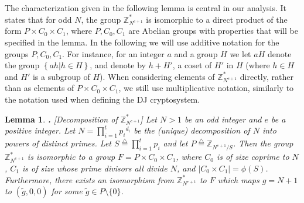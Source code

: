 \documentclass{article}
\def\eqdef{\stackrel {\triangle}{=}}
\newcommand{\order}{{\mathrm{ord}}}
\newcommand{\encdj}{{E}_{N,e}}
\newcommand{\set}[1]{\left\{#1\right\}}
\newcommand{\size}[1]{|#1|}
\newcommand{\condset}[2]{\set{#1|#2}}
\newcommand{\Z}{{\mathbb{Z}}}
\newtheorem{LEMMA}{Lemma}[section]
\newenvironment{lemma}{\begin{LEMMA} \hspace{-.85em} {\bf .} \rm}%
	{\end{LEMMA}}
\newcommand{\U}[1]{\mathbb{Z}_{#1}^*}
\begin{document}
The characterization given in the following lemma is central in our
analysis. It states that for odd $N$, the group $\U{N^{e+1}}$ is
isomorphic to a direct product of the form $P\times C_0\times C_1$,
where $P,C_0,C_1$ are Abelian groups with properties that will be
specified in the lemma. In the following we will use additive
notation for the groups $P,C_0,C_1$. For instance, for an integer $a$
and a group $H$ we let $aH$ denote the group $\condset{ah}{h\in H}$,
and denote by $h+H'$, a coset of $H'$ in $H$ (where $h\in H$ and $H'$
is a subgroup of $H$). When considering elements of $\U{N^{e+1}}$
directly, rather than as elements of $P\times C_0\times C_1$, we
still use multiplicative notation, similarly to the notation used
when defining the DJ cryptosystem.
\begin{lemma}[Decomposition of $\U{N^{e+1}}$]
\label{lem-g-structure} Let $N>1$ be an odd integer and $e$ be a
positive integer.  Let $N=\prod_{i=1}^t{p_i}^{d_i}$ be the (unique)
decomposition of $N$ into powers of distinct primes. Let
$S\eqdef\prod^t_{i=1}p_i$ and let $P\eqdef\Z_{N^{e+1}/S}$. Then the
group $\U{N^{e+1}}$ is isomorphic to a group $F= P\times C_0\times
C_1$, where $C_0$ is of size coprime to $N$, $C_1$ is of size whose
prime divisors all divide $N$, and $\size{C_0\times C_1}=\phi(S)$.
Furthermore, there exists an isomorphism from $\U{N^{e+1}}$ to $F$
which maps $g=N+1$ to $(\tilde{g},0,0)$ for some $\tilde{g}\in
P\setminus\{0\}$.
\end{lemma}

%
\end{document}
